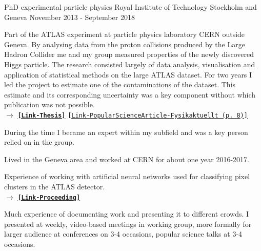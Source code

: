 


\begin{cventries}


\cventry
{PhD experimental particle physics} %
{Royal Institute of Technology} %
{Stockholm and Geneva} %
{November 2013 - September 2018} %
{ %
\begin{cvitems}
\item {Part of the ATLAS experiment at particle physics laboratory CERN outside Geneva.
By analysing data from the proton collisions produced by the Large Hadron Collider me and my group measured properties of the newly discovered Higgs particle. 
The research consisted largely of data analysis, visualisation and application of statistical methods on the large ATLAS dataset. 
For two years I led the project to estimate one of the contaminations of the dataset.
This estimate and its corresponding uncertainty was a key component without which publication was not possible. \\
$\rightarrow$  \href{http://kth.diva-portal.org/smash/record.jsf?pid=diva2\%3A1244395\&dswid=7018}{{\bf \texttt{[Link-Thesis]}}} \href{http://www.fysikersamfundet.se/wp-content/uploads/Fysikaktuellt3-18_Webb.pdf}{\texttt{[Link-PopularScienceArticle-Fysikaktuellt (p. 8)]}}
}
\item {During the time I became an expert within my subfield and was a key person relied on in the group. 
}
\item {Lived in the Geneva area and worked at CERN for about one year 2016-2017.
}
\item {Experience of working with artificial neural networks used for classifying  pixel clusters in the ATLAS detector.
 \\
$\rightarrow$  \href{https://pos.sissa.it/276/213/pdf}{{\bf \texttt{[Link-Proceeding]}}}
}
\item {Much experience of documenting work and presenting it to different crowds.
	I presented at weekly, video-based meetings in working group, more formally for larger audience at conferences on 3-4 occasions, popular science talks at 3-4 occasions.
}
\end{cvitems}}
\end{cventries}
